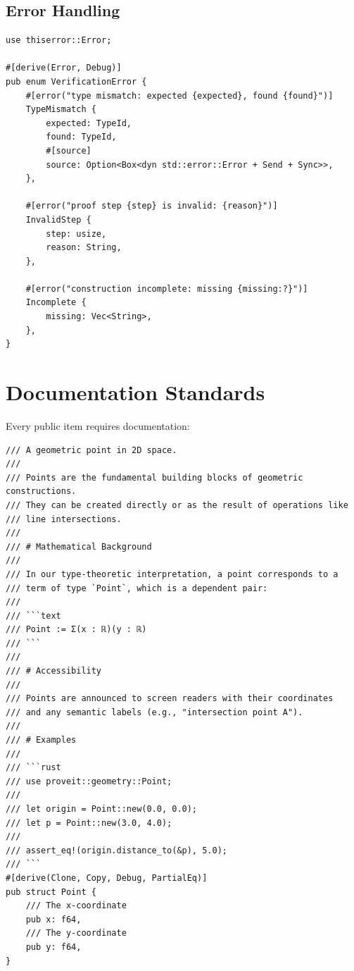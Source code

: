 \documentclass[11pt,a4paper,twoside]{report}
\begin{document}
\subsection{Error Handling}

\begin{lstlisting}[caption={Domain-specific error types}, label=lst:errors]
use thiserror::Error;

#[derive(Error, Debug)]
pub enum VerificationError {
    #[error("type mismatch: expected {expected}, found {found}")]
    TypeMismatch {
        expected: TypeId,
        found: TypeId,
        #[source]
        source: Option<Box<dyn std::error::Error + Send + Sync>>,
    },

    #[error("proof step {step} is invalid: {reason}")]
    InvalidStep {
        step: usize,
        reason: String,
    },

    #[error("construction incomplete: missing {missing:?}")]
    Incomplete {
        missing: Vec<String>,
    },
}
\end{lstlisting}

\section{Documentation Standards}

Every public item requires documentation:

\begin{lstlisting}[caption={Documentation example}, label=lst:docs]
/// A geometric point in 2D space.
///
/// Points are the fundamental building blocks of geometric constructions.
/// They can be created directly or as the result of operations like
/// line intersections.
///
/// # Mathematical Background
///
/// In our type-theoretic interpretation, a point corresponds to a
/// term of type `Point`, which is a dependent pair:
///
/// ```text
/// Point := Σ(x : ℝ)(y : ℝ)
/// ```
///
/// # Accessibility
///
/// Points are announced to screen readers with their coordinates
/// and any semantic labels (e.g., "intersection point A").
///
/// # Examples
///
/// ```rust
/// use proveit::geometry::Point;
///
/// let origin = Point::new(0.0, 0.0);
/// let p = Point::new(3.0, 4.0);
///
/// assert_eq!(origin.distance_to(&p), 5.0);
/// ```
#[derive(Clone, Copy, Debug, PartialEq)]
pub struct Point {
    /// The x-coordinate
    pub x: f64,
    /// The y-coordinate
    pub y: f64,
}
\end{lstlisting}

\end{document}
